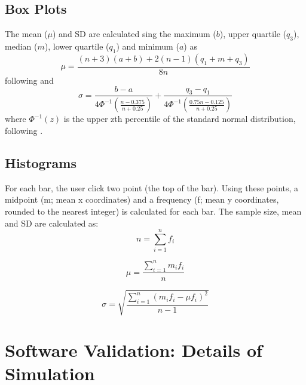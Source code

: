 \documentclass[12pt]{article}
\begin{document}
\subsection{Box Plots} 
The mean ($\mu$) and SD are calculated sing the maximum ($b$), upper quartile ($q_3$), median ($m$), lower quartile ($q_1$) and minimum ($a$) as 
\begin{equation}
\mu = \frac{(n+3)(a+b) + 2(n-1)(q_1 + m + q_3)}{8n}
\end{equation}
following \citet{Bland2015} and
\begin{equation}
\sigma = \frac{b-a}{4\Phi^{-1}(\frac{n-0.375}{n+0.25})} + \frac{q_3-q_1}{4\Phi^{-1}(\frac{0.75n-0.125}{n+0.25})}
\end{equation}
where $\Phi^{-1}(z)$ is the upper zth percentile of the standard normal distribution, following \citet{Wan2014}. 

\subsection{Histograms} 
For each bar, the user click two point (the top of the bar). Using these points, a midpoint (m; mean x coordinates) and a frequency (f; mean y coordinates, rounded to the nearest integer) is calculated for each bar. The sample size, mean and SD are calculated as:
\begin{equation}
n = \sum_{i=1}^n{f_i}
\end{equation}

\begin{equation}
\mu = \frac{\sum_{i=1}^n{m_i f_i}}{n}
\end{equation}

\begin{equation}
\sigma = \sqrt{\frac{\sum_{i=1}^n{(m_i f_i - \mu f_i)^2}}{n-1}}
\end{equation}

\section{Software Validation: Details of Simulation}
\end{document}
